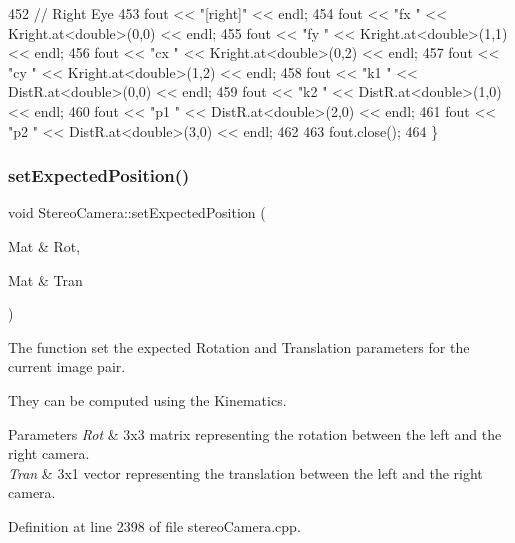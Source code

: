\begin{DoxyCode}
452     \textcolor{comment}{// Right Eye}
453     fout << \textcolor{stringliteral}{"[right]"} << endl;
454     fout << \textcolor{stringliteral}{"fx "} << Kright.at<\textcolor{keywordtype}{double}>(0,0) << endl;
455     fout << \textcolor{stringliteral}{"fy "} << Kright.at<\textcolor{keywordtype}{double}>(1,1) << endl;
456     fout << \textcolor{stringliteral}{"cx "} << Kright.at<\textcolor{keywordtype}{double}>(0,2) << endl;
457     fout << \textcolor{stringliteral}{"cy "} << Kright.at<\textcolor{keywordtype}{double}>(1,2) << endl;
458     fout << \textcolor{stringliteral}{"k1 "} << DistR.at<\textcolor{keywordtype}{double}>(0,0) << endl;
459     fout << \textcolor{stringliteral}{"k2 "} << DistR.at<\textcolor{keywordtype}{double}>(1,0) << endl;
460     fout << \textcolor{stringliteral}{"p1 "} << DistR.at<\textcolor{keywordtype}{double}>(2,0) << endl;
461     fout << \textcolor{stringliteral}{"p2 "} << DistR.at<\textcolor{keywordtype}{double}>(3,0) << endl;
462 
463     fout.close();
464 \}
\end{DoxyCode}
\mbox{\label{classStereoCamera_a9ecb303d7b36eaf5f086d8ddebd29b95}} 
\subsubsection{\texorpdfstring{set\+Expected\+Position()}{setExpectedPosition()}}
{\footnotesize\ttfamily void Stereo\+Camera\+::set\+Expected\+Position (\begin{DoxyParamCaption}\item[{Mat \&}]{Rot,  }\item[{Mat \&}]{Tran }\end{DoxyParamCaption})}



The function set the expected Rotation and Translation parameters for the current image pair. 

They can be computed using the Kinematics. 
\begin{DoxyParams}{Parameters}
{\em Rot} & 3x3 matrix representing the rotation between the left and the right camera. \\
\hline
{\em Tran} & 3x1 vector representing the translation between the left and the right camera. \\
\hline
\end{DoxyParams}


Definition at line 2398 of file stereo\+Camera.\+cpp.


